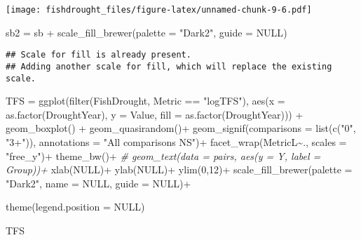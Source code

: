 \documentclass[
]{article}
\newenvironment{Shaded}{\begin{snugshade}}{\end{snugshade}}
\newcommand{\AttributeTok}[1]{\textcolor[rgb]{0.77,0.63,0.00}{#1}}
\newcommand{\CommentTok}[1]{\textcolor[rgb]{0.56,0.35,0.01}{\textit{#1}}}
\newcommand{\ConstantTok}[1]{\textcolor[rgb]{0.00,0.00,0.00}{#1}}
\newcommand{\DecValTok}[1]{\textcolor[rgb]{0.00,0.00,0.81}{#1}}
\newcommand{\FunctionTok}[1]{\textcolor[rgb]{0.00,0.00,0.00}{#1}}
\newcommand{\NormalTok}[1]{#1}
\newcommand{\OtherTok}[1]{\textcolor[rgb]{0.56,0.35,0.01}{#1}}
\newcommand{\SpecialCharTok}[1]{\textcolor[rgb]{0.00,0.00,0.00}{#1}}
\newcommand{\StringTok}[1]{\textcolor[rgb]{0.31,0.60,0.02}{#1}}
\begin{document}
\texttt{[image: fishdrought\_files/figure-latex/unnamed-chunk-9-6.pdf]}

\begin{Shaded}
\begin{Highlighting}[]
\NormalTok{  sb2 }\OtherTok{=}\NormalTok{ sb }\SpecialCharTok{+}  \FunctionTok{scale\_fill\_brewer}\NormalTok{(}\AttributeTok{palette =} \StringTok{"Dark2"}\NormalTok{, }\AttributeTok{guide =} \ConstantTok{NULL}\NormalTok{)}
\end{Highlighting}
\end{Shaded}

\begin{verbatim}
## Scale for fill is already present.
## Adding another scale for fill, which will replace the existing scale.
\end{verbatim}

\begin{Shaded}
\begin{Highlighting}[]
\NormalTok{TFS }\OtherTok{=}  \FunctionTok{ggplot}\NormalTok{(}\FunctionTok{filter}\NormalTok{(FishDrought, Metric }\SpecialCharTok{==} \StringTok{"logTFS"}\NormalTok{),  }\FunctionTok{aes}\NormalTok{(}\AttributeTok{x =} \FunctionTok{as.factor}\NormalTok{(DroughtYear), }\AttributeTok{y =}\NormalTok{ Value, }\AttributeTok{fill =} \FunctionTok{as.factor}\NormalTok{(DroughtYear))) }\SpecialCharTok{+} 
  \FunctionTok{geom\_boxplot}\NormalTok{() }\SpecialCharTok{+}
  \FunctionTok{geom\_quasirandom}\NormalTok{()}\SpecialCharTok{+}
  \FunctionTok{geom\_signif}\NormalTok{(}\AttributeTok{comparisons =} \FunctionTok{list}\NormalTok{(}\FunctionTok{c}\NormalTok{(}\StringTok{"0"}\NormalTok{, }\StringTok{"3+"}\NormalTok{)), }\AttributeTok{annotations =} \StringTok{"All comparisons NS"}\NormalTok{)}\SpecialCharTok{+}
  \FunctionTok{facet\_wrap}\NormalTok{(MetricL}\SpecialCharTok{\textasciitilde{}}\NormalTok{., }\AttributeTok{scales =} \StringTok{"free\_y"}\NormalTok{)}\SpecialCharTok{+} \FunctionTok{theme\_bw}\NormalTok{()}\SpecialCharTok{+}
 \CommentTok{\# geom\_text(data = pairs, aes(y = Y, label = Group))+}
  \FunctionTok{xlab}\NormalTok{(}\ConstantTok{NULL}\NormalTok{)}\SpecialCharTok{+} \FunctionTok{ylab}\NormalTok{(}\ConstantTok{NULL}\NormalTok{)}\SpecialCharTok{+} \FunctionTok{ylim}\NormalTok{(}\DecValTok{0}\NormalTok{,}\DecValTok{12}\NormalTok{)}\SpecialCharTok{+}
  \FunctionTok{scale\_fill\_brewer}\NormalTok{(}\AttributeTok{palette =} \StringTok{"Dark2"}\NormalTok{, }\AttributeTok{name =} \ConstantTok{NULL}\NormalTok{, }\AttributeTok{guide =} \ConstantTok{NULL}\NormalTok{)}\SpecialCharTok{+}

  \FunctionTok{theme}\NormalTok{(}\AttributeTok{legend.position =} \ConstantTok{NULL}\NormalTok{)}

\NormalTok{  TFS}
\end{Highlighting}
\end{Shaded}
\end{document}
